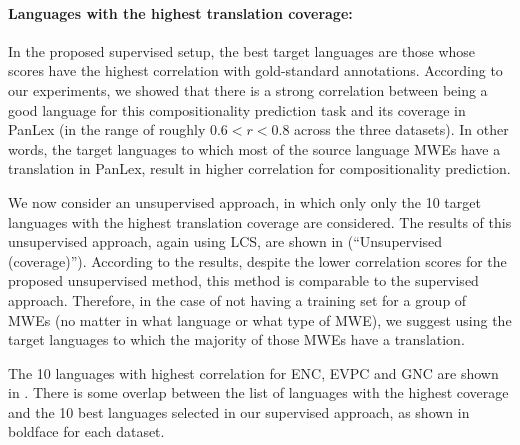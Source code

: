 \documentclass[output=paper
,modfonts
,nonflat]{langsci/langscibook}
\begin{document}
\paragraph*{Languages with the highest translation coverage:}

In the proposed supervised setup, the best target languages are those
whose scores have the highest correlation with gold-standard
annotations.  According to our experiments, we showed that there is a
strong correlation between being a good language for this
compositionality prediction task and its coverage in PanLex (in the
range of roughly $0.6 < r < 0.8$ across the three datasets). In other words, the
target languages to which most of the source language MWEs have a
translation in PanLex, result in higher correlation for
compositionality prediction.

We now consider an unsupervised approach, in which only only the 10
target languages with the highest translation coverage are
considered. The results of this unsupervised approach, again using
LCS, are shown in  (``Unsupervised
(coverage)''). According to the results, despite the lower correlation
scores for the proposed unsupervised method, this method is comparable
to the supervised approach.  Therefore, in the case of not having a
training set for a group of MWEs (no matter in what language or what
type of MWE), we suggest using the target languages to which the
majority of those MWEs have a translation.

The 10 languages with highest correlation for ENC, EVPC and GNC are
shown in . There is some overlap between the
list of languages with the highest coverage and the 10 best languages
selected in our supervised approach, as shown in boldface for each
dataset.
\end{document}
